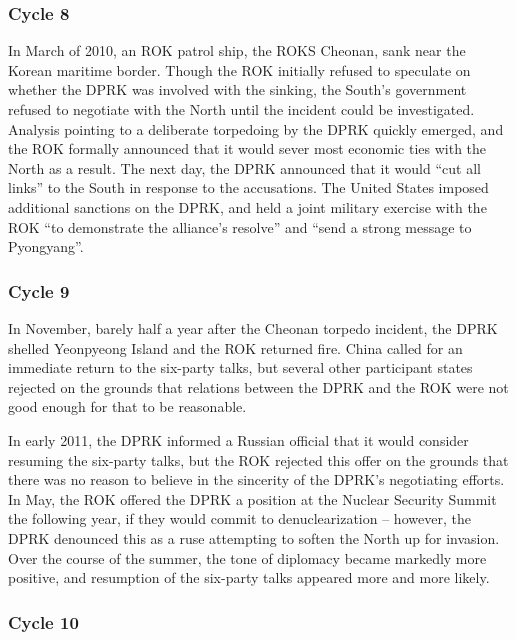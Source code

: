 \documentclass{article}
\begin{document}
\subsubsection{Cycle 8}

In March of 2010, an ROK patrol ship, the ROKS Cheonan, sank near the Korean maritime border\cite{branigan}. Though the ROK initially refused to speculate on whether the DPRK was involved with the sinking\cite{branigan}, the South’s government refused to negotiate with the North until the incident could be investigated\cite{davenport}. Analysis pointing to a deliberate torpedoing by the DPRK quickly emerged\cite{reuters}, and the ROK formally announced that it would sever most economic ties with the North as a result. The next day, the DPRK announced that it would “cut all links” to the South in response to the accusations\cite{davenport}. The United States imposed additional sanctions on the DPRK, and held a joint military exercise with the ROK “to demonstrate the alliance’s resolve” and “send a strong message to Pyongyang”\cite{starr}.


\subsubsection{Cycle 9}

In November, barely half a year after the Cheonan torpedo incident, the DPRK shelled Yeonpyeong Island and the ROK returned fire\cite{bbc}. China called for an immediate return to the six-party talks\cite{bbc}, but several other participant states rejected on the grounds that relations between the DPRK and the ROK were not good enough for that to be reasonable\cite{davenport}.

In early 2011, the DPRK informed a Russian official that it would consider resuming the six-party talks, but the ROK rejected this offer on the grounds that there was no reason to believe in the sincerity of the DPRK’s negotiating efforts\cite{davenport}. In May, the ROK offered the DPRK a position at the Nuclear Security Summit the following year, if they would commit to denuclearization – however, the DPRK denounced this as a ruse attempting to soften the North up for invasion\cite{davenport}. Over the course of the summer, the tone of diplomacy became markedly more positive, and resumption of the six-party talks appeared more and more likely\cite{davenport}.

\subsubsection{Cycle 10}
\end{document}
